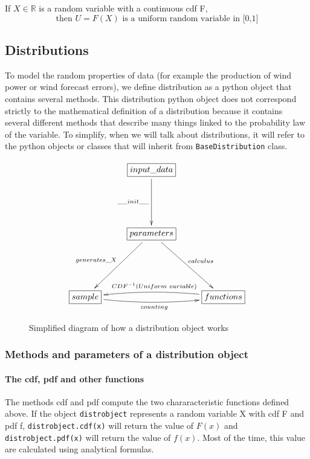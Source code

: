 \documentclass{article}
\begin{document}
	\begin{property}
	If $X \in \mathbb{R}$ is a random variable with a continuous cdf F,
	\begin{equation*}
	\text{then } U = F(X) \text{ is a uniform random variable in [0,1]}
	\end{equation*}
	\end{property}
	
	
	
	
	\subsection{Distributions}	
	
	To model the random properties of data (for example the production of wind power or wind forecast errors), we define distribution as a python object that contains several methods. This distribution python object does not correspond strictly to the mathematical definition of a distribution because it contains several different methods that describe many things linked to the probability law of the variable. To simplify, when we will talk about distributions, it will refer to the python objects or classes that will inherit from \texttt{BaseDistribution} class.
	
	\begin{figure}[H]
\[
   	\xymatrix{
   		 & \boxed{input\_data} \ar[dd]_{\_\_init\_\_} & \\
   		 & & \\
   		 & \boxed{parameters} \ar[ldd]_{generates\_X} \ar[rdd]^{calculus} & \\
   		 & & \\
   		\boxed{sample} \ar@/_/[rr]_{counting} & & \boxed{functions} \ar@/_/[ll]_{CDF^{-1}(Uniform\text{ }variable)}
   	}
   \]	 
   \caption{Simplified diagram of how a distribution object  works}
	\end{figure}	 
	
	\subsubsection{Methods and parameters of a distribution object}
	\paragraph{The cdf, pdf and other functions}
	The methods cdf and pdf compute the two chararacteristic functions defined above. If the object \texttt{distrobject}  represents a random variable X with cdf F and pdf f, \texttt{distrobject.cdf(x)} will return the value of $F(x)$ and \texttt{distrobject.pdf(x)} will return the value of $f(x)$. Most of the time, this value are calculated using analytical formulas.
	
\end{document}
